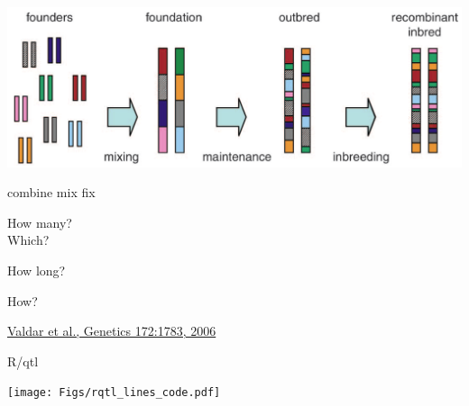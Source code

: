 \documentclass[12pt]{article}
\newcommand{\citesize}{\fontsize{14}{18} \selectfont}
\newcommand{\headsize}{\fontsize{35}{35} \selectfont}
\newcommand{\smallsize}{\fontsize{25}{30} \selectfont}
\newcommand{\smallersize}{\fontsize{20}{25} \selectfont}
\begin{document}
\vspace{20mm}

\centerline{\includegraphics[width=10in]{Figs/valdar_genet2006.png}}

\smallsize \color{myyellow}
\hspace*{52mm} combine \hspace*{35mm} mix \hspace*{52mm} fix

\smallersize
\color{mywhite}
\vspace{20pt}

\hspace*{6mm}
\begin{minipage}[t]{45mm}
\vspace*{0mm}
\centering

How many? \\[20pt]
Which?
\end{minipage}
\hspace{57mm}
\begin{minipage}[t]{45mm}
\vspace*{0mm}
\centering

How long?
\end{minipage}
\hspace{18mm}
\begin{minipage}[t]{45mm}
\vspace*{0mm}
\centering

How?
\end{minipage}


\vfill

\hfill {\citesize \color{citecolor} \href{http://www.genetics.org/content/172/3/1783.full}{Valdar et al., Genetics 172:1783, 2006}}

\vspace*{5mm}


\newpage


\headsize \color{myyellow}
\hfill \begin{minipage}{5.75in}
\centering
R/qtl
\end{minipage}

\vfill

\centerline{\texttt{[image: Figs/rqtl\_lines\_code.pdf]}}

\vspace{15mm}
\end{document}
